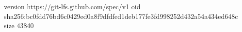 version https://git-lfs.github.com/spec/v1
oid sha256:bc0fdd76bd6c0429ed0a8f9dfdfed1deb177fe3fd998252d432a54a434ed648c
size 43840
